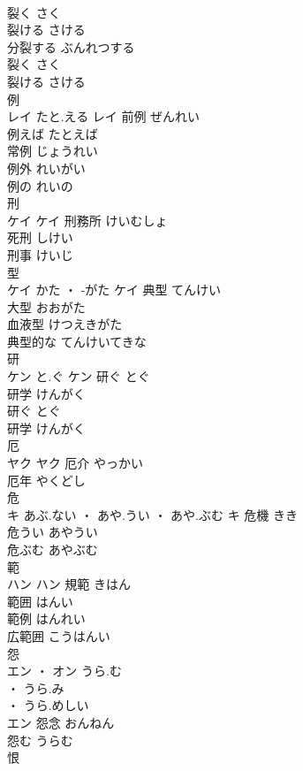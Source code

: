 \documentclass[8pt]{extreport}
\begin{document}
\begin{CJK}{UTF8}{min}
\\	裂く	さく	
\\	裂ける	さける	
\\	分裂する	ぶんれつする	
\\	裂く	さく	
\\	裂ける	さける	
\\	例	
\\	レイ	たと.える	レイ	前例	ぜんれい	
\\	例えば	たとえば	
\\	常例	じょうれい	
\\	例外	れいがい	
\\	例の	れいの	
\\	刑	
\\	ケイ		ケイ	刑務所	けいむしょ	
\\	死刑	しけい	
\\	刑事	けいじ	
\\	型	
\\	ケイ	かた ・ -がた	ケイ	典型	てんけい	
\\	大型	おおがた	
\\	血液型	けつえきがた	
\\	典型的な	てんけいてきな	
\\	研	
\\	ケン	と.ぐ	ケン	研ぐ	とぐ	
\\	研学	けんがく	
\\	研ぐ	とぐ	
\\	研学	けんがく	
\\	厄	
\\	ヤク		ヤク	厄介	やっかい	
\\	厄年	やくどし	
\\	危	
\\	キ	あぶ.ない ・ あや.うい ・ あや.ぶむ	キ	危機	きき	
\\	危うい	あやうい	
\\	危ぶむ	あやぶむ	
\\	範	
\\	ハン		ハン	規範	きはん	
\\	範囲	はんい	
\\	範例	はんれい	
\\	広範囲	こうはんい	
\\	怨	
\\	エン ・ オン	うら.む
\\	・ うら.み
\\	・ うら.めしい
\\	エン	怨念	おんねん	
\\	怨む	うらむ	
\\	恨 

\end{CJK}
\end{document}
